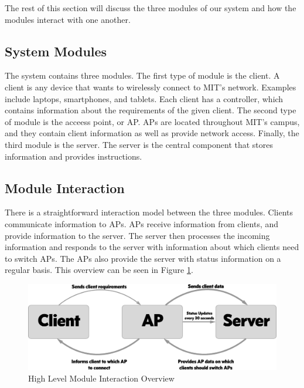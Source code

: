 \documentclass[10pt,journal,compsoc]{IEEEtran}
\begin{document}
		The rest of this section will discuss the three modules of our system and how the modules interact with one another.
		
		\subsection{System Modules}
		The system contains three modules. The first type of module is the client. A client is any device that wants to wirelessly connect to MIT's network. Examples include laptops, smartphones, and tablets. Each client has a controller, which contains information about the requirements of the given client. The second type of module is the acceess point, or AP. APs are located throughout MIT's campus, and they contain client information as well as provide network access. Finally, the third module is the server. The server is the central component that stores information and provides instructions.
		
		\subsection{Module Interaction}
		There is a straightforward interaction model between the three modules. Clients communicate information to APs. APs receive information from clients, and provide information to the server. The server then processes the incoming information and responds to the server with information about which clients need to switch APs. The APs also provide the server with status information on a regular basis. This overview can be seen in Figure \ref{fig:overview}. 
		
        \begin{figure}
            \includegraphics[width=\linewidth]{overviewDiagram.png}
            \caption{High Level Module Interaction Overview}
            \label{fig:overview}
        \end{figure}
		
		
\end{document}
